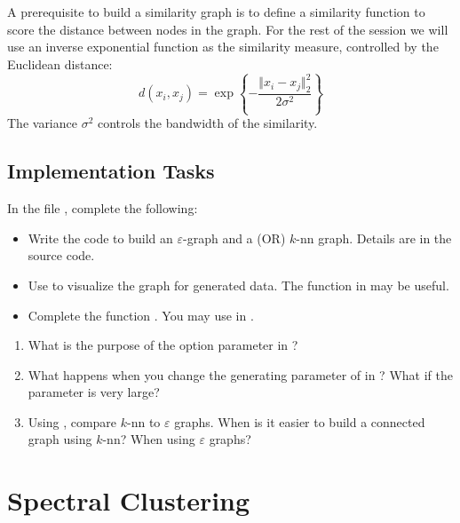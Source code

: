 \documentclass[11pt]{article}
\begin{document}
A prerequisite to build a similarity graph is to define a similarity function
to score the distance between nodes in the graph.
For the rest of the session we will use an inverse exponential function
as the similarity measure, controlled by the Euclidean distance:
\begin{equation}
d(x_i, x_j) = \exp \left\{-\frac{\Vert x_i - x_j \Vert^2_2}{2\sigma^2}\right\}
\end{equation}
The variance $\sigma^2$ controls the bandwidth of the similarity.

\subsection{Implementation Tasks}

In the file , complete the following:
\begin{itemize}[leftmargin=*]
	\item  Write the code to build an $\varepsilon$-graph and a
	(OR) $k$-nn graph. Details are in the source code.
	\item Use  to visualize the graph for generated data.
	      The function  in  may be useful.
	\item Complete the function .
	      You may use  in .
\end{itemize}

\begin{questionbox}
\begin{enumerate}[leftmargin=*]
    \item What is the purpose of the option parameter in ?
    \item  What happens when you change the generating parameter of
         in ?
        What if the parameter is very large?
    \item Using , compare $k$-nn to $\varepsilon$ graphs.
          When is it easier to build a connected graph using $k$-nn? When using $\varepsilon$ graphs?
\end{enumerate}
\end{questionbox}

\section{Spectral Clustering}
\end{document}

